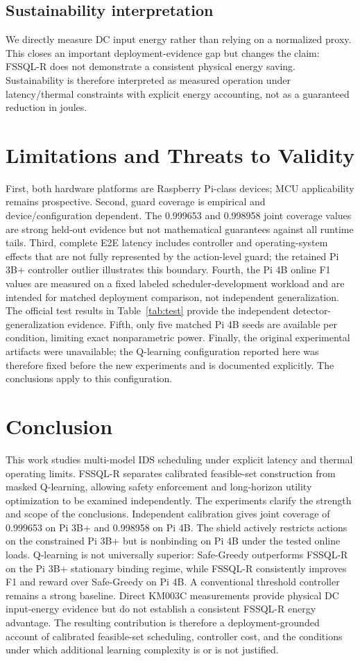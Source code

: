 \documentclass[journal]{IEEEtran}
\begin{document}
\subsection{Sustainability interpretation}
We directly measure DC input energy rather than relying on a normalized proxy. This closes an important deployment-evidence gap but changes the claim: FSSQL-R does not demonstrate a consistent physical energy saving. Sustainability is therefore interpreted as measured operation under latency/thermal constraints with explicit energy accounting, not as a guaranteed reduction in joules.

\section{Limitations and Threats to Validity}
First, both hardware platforms are Raspberry Pi-class devices; MCU applicability remains prospective. Second, guard coverage is empirical and device/configuration dependent. The 0.999653 and 0.998958 joint coverage values are strong held-out evidence but not mathematical guarantees against all runtime tails. Third, complete E2E latency includes controller and operating-system effects that are not fully represented by the action-level guard; the retained Pi 3B+ controller outlier illustrates this boundary. Fourth, the Pi 4B online F1 values are measured on a fixed labeled scheduler-development workload and are intended for matched deployment comparison, not independent generalization. The official test results in Table~\ref{tab:test} provide the independent detector-generalization evidence. Fifth, only five matched Pi 4B seeds are available per condition, limiting exact nonparametric power. Finally, the original experimental artifacts were unavailable; the Q-learning configuration reported here was therefore fixed before the new experiments and is documented explicitly. The conclusions apply to this configuration.

\section{Conclusion}
This work studies multi-model IDS scheduling under explicit latency and thermal operating limits. FSSQL-R separates calibrated feasible-set construction from masked Q-learning, allowing safety enforcement and long-horizon utility optimization to be examined independently. The experiments clarify the strength and scope of the conclusions. Independent calibration gives joint coverage of 0.999653 on Pi 3B+ and 0.998958 on Pi 4B. The shield actively restricts actions on the constrained Pi 3B+ but is nonbinding on Pi 4B under the tested online loads. Q-learning is not universally superior: Safe-Greedy outperforms FSSQL-R on the Pi 3B+ stationary binding regime, while FSSQL-R consistently improves F1 and reward over Safe-Greedy on Pi 4B. A conventional threshold controller remains a strong baseline. Direct KM003C measurements provide physical DC input-energy evidence but do not establish a consistent FSSQL-R energy advantage. The resulting contribution is therefore a deployment-grounded account of calibrated feasible-set scheduling, controller cost, and the conditions under which additional learning complexity is or is not justified.
\end{document}
